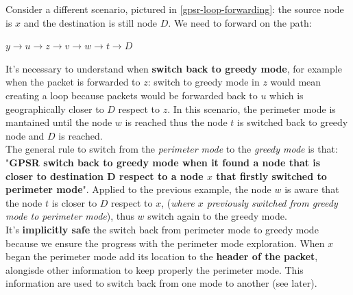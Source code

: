 \documentclass[10pt,a4paper]{report}
\theoremstyle{definition}
\begin{document}
Consider a different scenario, pictured in \ref{gpsr-loop-forwarding}: the source node is $x$ and the destination is still node $D$. We need to forward on the path:
\begin{center}
	$y \rightarrow u \rightarrow z \rightarrow v \rightarrow w \rightarrow t \rightarrow D$
\end{center}


It's necessary to understand when \textbf{switch back to greedy mode}, for example when the packet is forwarded to $z$: switch to greedy mode in $z$ would mean creating a loop because packets would be forwarded back to $u$ which is geographically closer to $D$ respect to $z$.
In this scenario, the perimeter mode is mantained until the node $w$ is reached thus the node $t$ is switched back to greedy node and $D$ is reached.\\
The general rule to switch from the \textit{perimeter mode} to the \textit{greedy mode} is that: "\textbf{GPSR switch back to greedy mode when it found a node that is closer to destination D respect to a node $x$ that firstly switched to perimeter mode}".
Applied to the previous example, the node $w$ is aware that the node $t$ is closer to $D$ respect to $x$, (\textit{where $x$ previously switched from greedy mode to perimeter mode}), thus $w$ switch again to the greedy mode.\\
It's \textbf{implicitly safe} the switch back from perimeter mode to greedy mode because we ensure the progress with the perimeter mode exploration.
When $x$ began the perimeter mode add its location to the \textbf{header of the packet}, alongisde other information to keep properly the perimeter mode. This information are used to switch back from one mode to another (see later).
\end{document}
